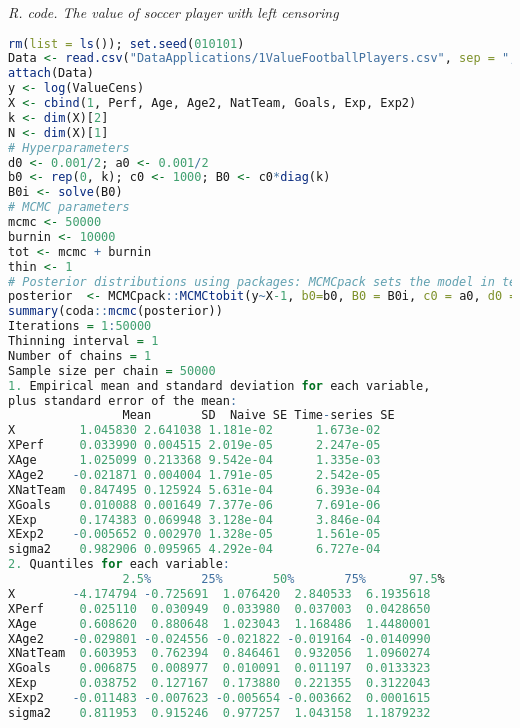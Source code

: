 \begin{tcolorbox}[enhanced,width=4.67in,center upper,
	fontupper=\large\bfseries,drop shadow southwest,sharp corners]
	\textit{R. code. The value of soccer player with left censoring}
	\begin{VF}
		\begin{lstlisting}[language=R]
rm(list = ls()); set.seed(010101)
Data <- read.csv("DataApplications/1ValueFootballPlayers.csv", sep = ",", header = TRUE, fileEncoding = "latin1")
attach(Data)
y <- log(ValueCens) 
X <- cbind(1, Perf, Age, Age2, NatTeam, Goals, Exp, Exp2)
k <- dim(X)[2]
N <- dim(X)[1]
# Hyperparameters
d0 <- 0.001/2; a0 <- 0.001/2
b0 <- rep(0, k); c0 <- 1000; B0 <- c0*diag(k)
B0i <- solve(B0)
# MCMC parameters
mcmc <- 50000
burnin <- 10000
tot <- mcmc + burnin
thin <- 1
# Posterior distributions using packages: MCMCpack sets the model in terms of the precision matrix
posterior  <- MCMCpack::MCMCtobit(y~X-1, b0=b0, B0 = B0i, c0 = a0, d0 = d0, burnin = burnin, mcmc = mcmc, thin = thin, below = 13.82, above = Inf)
summary(coda::mcmc(posterior))
Iterations = 1:50000
Thinning interval = 1 
Number of chains = 1 
Sample size per chain = 50000 
1. Empirical mean and standard deviation for each variable,
plus standard error of the mean:
				Mean       SD  Naive SE Time-series SE
X         1.045830 2.641038 1.181e-02      1.673e-02
XPerf     0.033990 0.004515 2.019e-05      2.247e-05
XAge      1.025099 0.213368 9.542e-04      1.335e-03
XAge2    -0.021871 0.004004 1.791e-05      2.542e-05
XNatTeam  0.847495 0.125924 5.631e-04      6.393e-04
XGoals    0.010088 0.001649 7.377e-06      7.691e-06
XExp      0.174383 0.069948 3.128e-04      3.846e-04
XExp2    -0.005652 0.002970 1.328e-05      1.561e-05
sigma2    0.982906 0.095965 4.292e-04      6.727e-04
2. Quantiles for each variable:
				2.5%       25%       50%       75%      97.5%
X        -4.174794 -0.725691  1.076420  2.840533  6.1935618
XPerf     0.025110  0.030949  0.033980  0.037003  0.0428650
XAge      0.608620  0.880648  1.023043  1.168486  1.4480001
XAge2    -0.029801 -0.024556 -0.021822 -0.019164 -0.0140990
XNatTeam  0.603953  0.762394  0.846461  0.932056  1.0960274
XGoals    0.006875  0.008977  0.010091  0.011197  0.0133323
XExp      0.038752  0.127167  0.173880  0.221355  0.3122043
XExp2    -0.011483 -0.007623 -0.005654 -0.003662  0.0001615
sigma2    0.811953  0.915246  0.977257  1.043158  1.1879232
\end{lstlisting}
	\end{VF}
\end{tcolorbox} 

